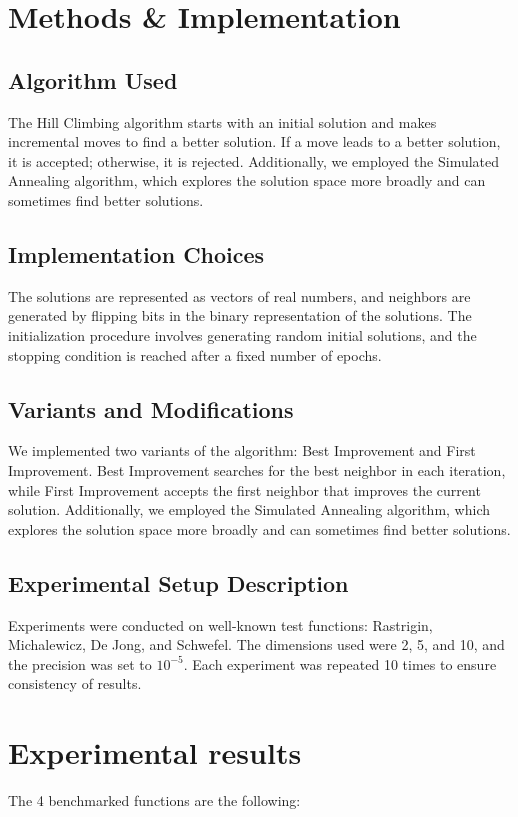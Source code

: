 \documentclass{article}
\begin{document}
\section{Methods \& Implementation}

\subsection{Algorithm Used}
The Hill Climbing algorithm starts with an initial solution and makes incremental moves to find a better solution. If a move leads to a better solution, it is accepted; otherwise, it is rejected. Additionally, we employed the Simulated Annealing algorithm, which explores the solution space more broadly and can sometimes find better solutions.

\subsection{Implementation Choices}
The solutions are represented as vectors of real numbers, and neighbors are generated by flipping bits in the binary representation of the solutions. The initialization procedure involves generating random initial solutions, and the stopping condition is reached after a fixed number of epochs.

\subsection{Variants and Modifications}
We implemented two variants of the algorithm: Best Improvement and First Improvement. Best Improvement searches for the best neighbor in each iteration, while First Improvement accepts the first neighbor that improves the current solution. Additionally, we employed the Simulated Annealing algorithm, which explores the solution space more broadly and can sometimes find better solutions.

\subsection{Experimental Setup Description}
Experiments were conducted on well-known test functions: Rastrigin, Michalewicz, De Jong, and Schwefel. The dimensions used were 2, 5, and 10, and the precision was set to $10^{-5}$. Each experiment was repeated 10 times to ensure consistency of results.

\section{Experimental results}
The 4 benchmarked functions are the following:
\end{document}
